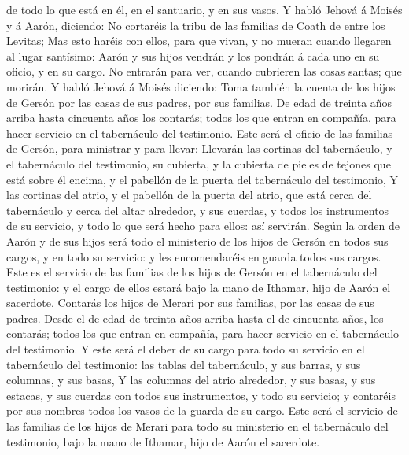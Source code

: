 de todo lo que está en él, en el santuario, y en sus vasos.
 Y habló Jehová á Moisés y á Aarón, diciendo:
 No cortaréis la tribu de las familias de Coath de entre
los Levitas;  Mas esto haréis con ellos, para que vivan,
y no mueran cuando llegaren al lugar santísimo: Aarón y sus hijos
vendrán y los pondrán á cada uno en su oficio, y en su cargo.
 No entrarán para ver, cuando cubrieren las cosas santas;
que morirán.  Y habló Jehová á Moisés diciendo:
 Toma también la cuenta de los hijos de Gersón por las
casas de sus padres, por sus familias.  De edad de
treinta años arriba hasta cincuenta años los contarás; todos los que
entran en compañía, para hacer servicio en el tabernáculo del
testimonio.  Este será el oficio de las familias de
Gersón, para ministrar y para llevar:  Llevarán las
cortinas del tabernáculo, y el tabernáculo del testimonio, su cubierta,
y la cubierta de pieles de tejones que está sobre él encima, y el
pabellón de la puerta del tabernáculo del testimonio,  Y
las cortinas del atrio, y el pabellón de la puerta del atrio, que está
cerca del tabernáculo y cerca del altar alrededor, y sus cuerdas, y
todos los instrumentos de su servicio, y todo lo que será hecho para
ellos: así servirán.  Según la orden de Aarón y de sus
hijos será todo el ministerio de los hijos de Gersón en todos sus
cargos, y en todo su servicio: y les encomendaréis en guarda todos sus
cargos.  Este es el servicio de las familias de los hijos
de Gersón en el tabernáculo del testimonio: y el cargo de ellos estará
bajo la mano de Ithamar, hijo de Aarón el sacerdote. 
Contarás los hijos de Merari por sus familias, por las casas de sus
padres.  Desde el de edad de treinta años arriba hasta el
de cincuenta años, los contarás; todos los que entran en compañía, para
hacer servicio en el tabernáculo del testimonio.  Y este
será el deber de su cargo para todo su servicio en el tabernáculo del
testimonio: las tablas del tabernáculo, y sus barras, y sus columnas, y
sus basas,  Y las columnas del atrio alrededor, y sus
basas, y sus estacas, y sus cuerdas con todos sus instrumentos, y todo
su servicio; y contaréis por sus nombres todos los vasos de la guarda de
su cargo.  Este será el servicio de las familias de los
hijos de Merari para todo su ministerio en el tabernáculo del
testimonio, bajo la mano de Ithamar, hijo de Aarón el sacerdote.
